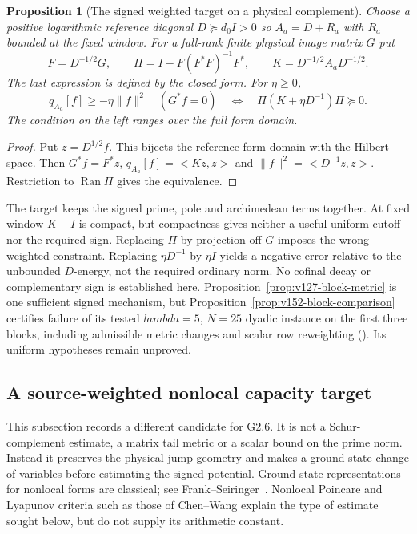 \documentclass[11pt]{article}
\def\lambda{lambda}%
\def\ip#1#2{<#1,#2>}%
\newtheorem{proposition}[theorem]{Proposition}
\theoremstyle{remark}
\newcommand{\ip}[2]{\left\langle #1,#2\right\rangle}
\begin{document}
\begin{proposition}[The signed weighted target on a physical complement]
\label{prop:v127-weighted-complement}
Choose a positive logarithmic reference diagonal $D\succeq d_0I>0$
so $A_a=D+R_a$ with $R_a$ bounded at the fixed window. For a full-rank
finite physical image matrix $G$ put
\[
 F=D^{-1/2}G,\qquad
 \Pi=I-F(F^*F)^{-1}F^*,\qquad
 K=D^{-1/2}A_aD^{-1/2}.
\]
The last expression is defined by the closed form. For $\eta\ge0$,
\begin{equation}\label{eq:v127-weighted-complement}
 q_{A_a}[f]\ge-\eta\|f\|^2\quad(G^*f=0)
 \quad\Longleftrightarrow\quad
 \Pi(K+\eta D^{-1})\Pi\succeq0.
\end{equation}
The condition on the left ranges over the full form domain.
\end{proposition}
\begin{proof}
Put $z=D^{1/2}f$. This bijects the reference form domain with the
Hilbert space. Then $G^*f=F^*z$,
$q_{A_a}[f]=\ip{Kz}{z}$ and $\|f\|^2=\ip{D^{-1}z}{z}$.
Restriction to $\operatorname{Ran}\Pi$ gives the equivalence.
\end{proof}

The target keeps the signed prime, pole and archimedean terms together.
At fixed window $K-I$ is compact, but compactness gives neither a useful
uniform cutoff nor the required sign. Replacing $\Pi$ by projection off
$G$ imposes the wrong weighted constraint. Replacing $\eta D^{-1}$ by
$\eta I$ yields a negative error relative to the unbounded $D$-energy,
not the required ordinary norm. No cofinal decay or complementary sign
is established here. Proposition~\ref{prop:v127-block-metric} is one
sufficient signed mechanism, but Proposition~\ref{prop:v152-block-comparison}
certifies failure of its tested $\lambda=5$, $N=25$ dyadic instance on the first three blocks,
including admissible metric changes and scalar row reweighting (). Its
uniform hypotheses remain unproved.

\subsection{A source-weighted nonlocal capacity target}

This subsection records a different candidate for G2.6. It is not a
Schur-complement estimate, a matrix tail metric or a scalar bound on the
prime norm. Instead it preserves the physical jump geometry and makes
a ground-state change of variables before estimating the signed
potential. Ground-state representations for nonlocal forms are
classical; see Frank--Seiringer~\cite{FrankSeiringer2008}. Nonlocal
Poincare and Lyapunov criteria such as those of Chen--Wang
\cite{ChenWang2013} explain the type of estimate sought below, but do
not supply its arithmetic constant.
\end{document}
